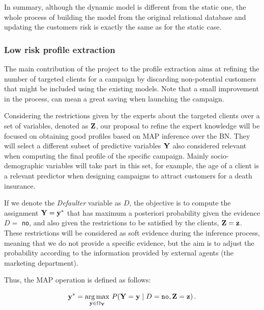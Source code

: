 In summary, although the dynamic model is different from the static one, the whole process of building the model from the original relational database and updating the customers risk is exactly the same as for the static case.

\subsubsection{Low risk profile extraction} \label{subsubsec:profileExtraction}

The main contribution of the project to the profile extraction aims at refining the number of targeted clients for a campaign by discarding non-potential customers that might be included using the existing models. Note that a small improvement in the process, can mean a great saving when launching the campaign. 

Considering the restrictions given by the experts about the targeted clients over a set of variables, denoted as $\Z$, our proposal to refine the expert knowledge will be focused on obtaining good profiles based on MAP inference over the BN.  They will select a different subset of predictive variables $\Y$ also considered relevant when computing the final profile of the specific campaign. Mainly  socio-demographic variables will take part in this set, for example, the age of a client is a relevant predictor when designing campaigns to attract customers for a death insurance. 

If we denote the \emph{Defaulter} variable as $D$,  the objective is to compute the assignment $\Y = \y^{*}$ that has maximum a posteriori probability given the evidence $D=$ \texttt{no}, and also given the restrictions to be satisfied by the clients, $\Z=\z$. These restrictions will be considered as soft evidence during the inference process, meaning that we do not provide a specific evidence, but the aim is to adjust the probability according to the information provided by external agents (the marketing department). 
 
Thus, the MAP operation is defined as follows:

\begin{equation}
\y^{*} = \underset{\y\in\Omega_{\Y}} {\mathrm{arg\,max}} ~ P(\Y=\y\mid D = \texttt{no}, \Z=\z)\, .
\label{eq:MAP}
\end{equation}

